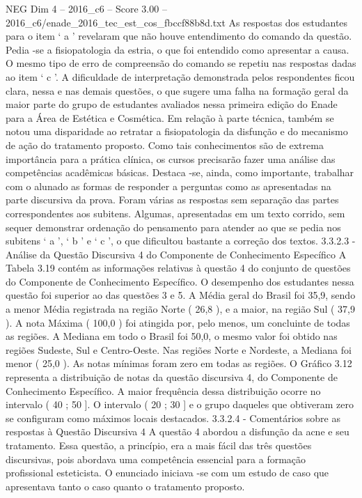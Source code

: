 \begin{textsample}{NEG Dim 4 – 2016\_c6 – Score 3.00 – 2016\_c6/enade\_2016\_tec\_est\_cos\_fbccf88b8d.txt}
As respostas dos estudantes para o item ‘ a ’ revelaram que não houve entendimento do comando da questão.
Pedia -se a fisiopatologia da estria, o que foi entendido como apresentar a causa.
O mesmo tipo de erro de compreensão do comando se repetiu nas respostas dadas ao item ‘ c ’.
A dificuldade de interpretação demonstrada pelos respondentes ficou clara, nessa e nas demais questões, o que sugere uma falha na formação geral da maior parte do grupo de estudantes avaliados nessa primeira edição do Enade para a Área de Estética e Cosmética.
Em relação à parte técnica, também se notou uma disparidade ao retratar a fisiopatologia da disfunção e do mecanismo de ação do tratamento proposto.
Como tais conhecimentos são de extrema importância para a prática clínica, os cursos precisarão fazer uma análise das competências acadêmicas básicas.
Destaca -se, ainda, como importante, trabalhar com o alunado as formas de responder a perguntas como as apresentadas na parte discursiva da prova.
Foram várias as respostas sem separação das partes correspondentes aos subitens.
Algumas, apresentadas em um texto corrido, sem sequer demonstrar ordenação do pensamento para atender ao que se pedia nos subitens ‘ a ’, ‘ b ’ e ‘ c ’, o que dificultou bastante a correção dos textos. 3.3.2.3 - Análise da Questão Discursiva 4 do Componente de Conhecimento Específico A Tabela 3.19 contém as informações relativas à questão 4 do conjunto de questões do Componente de Conhecimento Específico.
O desempenho dos estudantes nessa questão foi superior ao das questões 3 e 5.
A Média geral do Brasil foi 35,9, sendo a menor Média registrada na região Norte ( 26,8 ), e a maior, na região Sul ( 37,9 ).
A nota Máxima ( 100,0 ) foi atingida por, pelo menos, um concluinte de todas as regiões.
A Mediana em todo o Brasil foi 50,0, o mesmo valor foi obtido nas regiões Sudeste, Sul e Centro-Oeste.
Nas regiões Norte e Nordeste, a Mediana foi menor ( 25,0 ).
As notas mínimas foram zero em todas as regiões.
O Gráfico 3.12 representa a distribuição de notas da questão discursiva 4, do Componente de Conhecimento Específico.
A maior frequência dessa distribuição ocorre no intervalo ( 40 ; 50 ].
O intervalo ( 20 ; 30 ] e o grupo daqueles que obtiveram zero se configuram como máximos locais destacados. 3.3.2.4 - Comentários sobre as respostas à Questão Discursiva 4 A questão 4 abordou a disfunção da acne e seu tratamento.
Essa questão, a princípio, era a mais fácil das três questões discursivas, pois abordava uma competência essencial para a formação profissional esteticista.
O enunciado iniciava -se com um estudo de caso que apresentava tanto o caso quanto o tratamento proposto.

\end{textsample}
